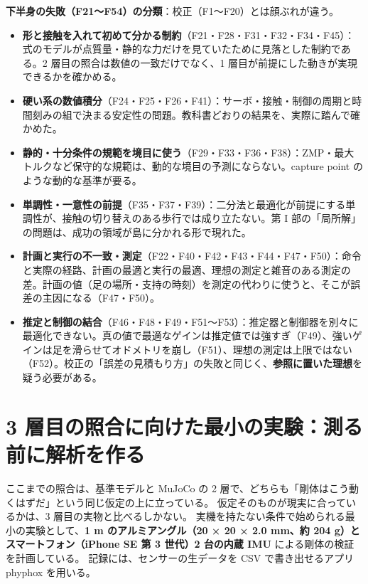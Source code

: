\documentclass[paper=a4paper,fontsize=10pt,twocolumn,column_gap=2zw,line_length=24zw,number_of_lines=46,head_space=20mm]{jlreq}
\begin{document}
\textbf{下半身の失敗（F21〜F54）の分類}：校正（F1〜F20）とは顔ぶれが違う。
\begin{itemize}\setlength{\itemsep}{0pt}
\item \textbf{形と接触を入れて初めて分かる制約}（F21・F28・F31・F32・F34・F45）：式のモデルが点質量・静的な力だけを見ていたために見落とした制約である。2 層目の照合は数値の一致だけでなく、1 層目が前提にした動きが実現できるかを確かめる。
\item \textbf{硬い系の数値積分}（F24・F25・F26・F41）：サーボ・接触・制御の周期と時間刻みの組で決まる安定性の問題。教科書どおりの結果を、実際に踏んで確かめた。
\item \textbf{静的・十分条件の規範を境目に使う}（F29・F33・F36・F38）：ZMP・最大トルクなど保守的な規範は、動的な境目の予測にならない。capture point のような動的な基準が要る。
\item \textbf{単調性・一意性の前提}（F35・F37・F39）：二分法と最適化が前提にする単調性が、接触の切り替えのある歩行では成り立たない。第 I 部の「局所解」の問題は、成功の領域が島に分かれる形で現れた。
\item \textbf{計画と実行の不一致・測定}（F22・F40・F42・F43・F44・F47・F50）：命令と実際の経路、計画の最適と実行の最適、理想の測定と雑音のある測定の差。計画の値（足の場所・支持の時刻）を測定の代わりに使うと、そこが誤差の主因になる（F47・F50）。
\item \textbf{推定と制御の結合}（F46・F48・F49・F51〜F53）：推定器と制御器を別々に最適化できない。真の値で最適なゲインは推定値では強すぎ（F49）、強いゲインは足を滑らせてオドメトリを崩し（F51）、理想の測定は上限ではない（F52）。校正の「誤差の見積もり方」の失敗と同じく、\textbf{参照に置いた理想}を疑う必要がある。
\end{itemize}


\section{3 層目の照合に向けた最小の実験：測る前に解析を作る}\label{sec:bangai}

ここまでの照合は、基準モデルと MuJoCo の 2 層で、どちらも「剛体はこう動くはずだ」という同じ仮定の上に立っている。
仮定そのものが現実に合っているかは、3 層目の実物と比べるしかない。
実機を持たない条件で始められる最小の実験として、\textbf{1 m のアルミアングル（20 × 20 × 2.0 mm、約 204 g）とスマートフォン（iPhone SE 第 3 世代）2 台の内蔵 IMU} による剛体の検証を計画している。
記録には、センサーの生データを CSV で書き出せるアプリ phyphox \cite{phyphox} を用いる。
\end{document}
